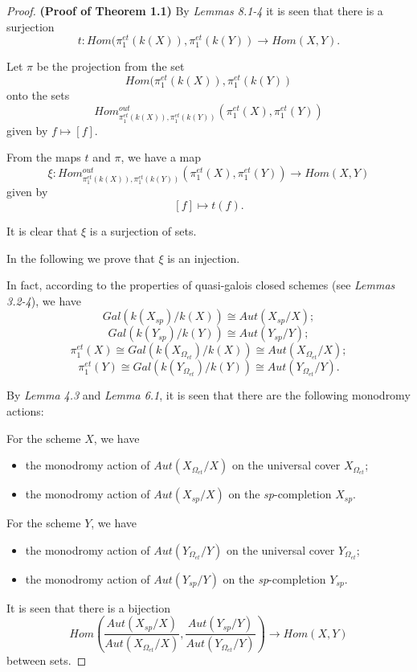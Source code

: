 \documentclass[12pt,twoside,reqno]{amsart}
\theoremstyle{definition}
\numberwithin{equation}{section}
\begin{document}
\begin{proof}
\textbf{(Proof of Theorem 1.1)} By \emph{Lemmas 8.1-4} it is seen that there is a surjection $$t: Hom(\pi_{1}^{et}(k(X)),\pi_{1}^{et}(k(Y))\to Hom(X,Y).$$

Let $\pi$ be the projection from the set $$Hom(\pi_{1}^{et}(k(X)),\pi_{1}^{et}(k(Y))$$ onto the sets $$Hom_{\pi _{1}^{et}(k(X)),\pi _{1}^{et}(k(Y))
}^{out}\left( \pi _{1}^{et}\left( X\right) ,\pi _{1}^{et}\left( Y\right)
\right)$$  given by $f \mapsto [f]$.

From the maps $t$ and $\pi$, we have a map $$\xi: Hom_{\pi _{1}^{et}(k(X)),\pi _{1}^{et}(k(Y))
}^{out}\left( \pi _{1}^{et}\left( X\right) ,\pi _{1}^{et}\left( Y\right)
\right)\to Hom(X,Y)$$ given by $$[f]\mapsto t(f).$$

It is clear that $\xi$ is a surjection of sets.

In the following we prove that $\xi$ is an injection.

In fact, according to the properties of quasi-galois closed schemes (see \emph{Lemmas 3.2-4}),
we have $$Gal(k(X_{sp})/k(X))\cong Aut(X_{sp}/X);$$ $$Gal(k(Y_{sp})/k(Y))\cong Aut(Y_{sp}/Y);$$ $$\pi_{1}^{et}(X)\cong Gal(k(X_{\Omega _{et}})/k(X))\cong Aut(X_{\Omega _{et}}/X);$$  $$\pi_{1}^{et}(Y)\cong Gal(k(Y_{\Omega _{et}})/k(Y))\cong Aut(Y_{\Omega _{et}}/Y).$$


By \emph{Lemma 4.3} and \emph{Lemma 6.1}, it is seen that there are the following monodromy actions:

For the scheme $X$, we have
\begin{itemize}
\item the monodromy action of $Aut(X_{\Omega_{et}}/X)$  on the universal cover $X_{\Omega_{et}}$;

\item the monodromy action of $Aut(X_{sp}/X)$ on the \emph{sp}-completion $X_{sp}$.
\end{itemize}

For the scheme $Y$, we have
\begin{itemize}
\item the monodromy action of $Aut(Y_{\Omega_{et}}/Y)$  on the universal cover $Y_{\Omega_{et}}$;

\item the monodromy action of $Aut(Y_{sp}/Y)$ on the \emph{sp}-completion $Y_{sp}$.
\end{itemize}

It is seen  that there is a
 bijection $$ Hom(\frac{Aut(X_{sp}/X)}{Aut(X_{\Omega _{et}}/X)},\frac{Aut(Y_{sp}/Y)}{Aut(Y_{\Omega _{et}}/Y)})\to Hom(X,Y)$$ between sets.


\end{proof}
\end{document}
